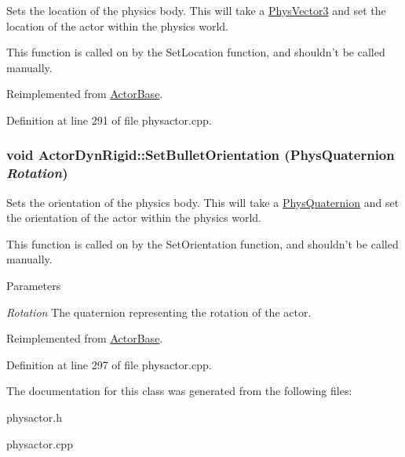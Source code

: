 Sets the location of the physics body. This will take a \hyperlink{classPhysVector3}{PhysVector3} and set the location of the actor within the physics world. \par
 This function is called on by the SetLocation function, and shouldn't be called manually. 

Reimplemented from \hyperlink{classActorBase_af64a57138bbd32c52581a5c8d0d29a76}{ActorBase}.

Definition at line 291 of file physactor.cpp.\hypertarget{classActorDynRigid_ae471894081ae956dd79844a2f14fb1d9}{
\subsubsection[{SetBulletOrientation}]{\setlength{\rightskip}{0pt plus 5cm}void ActorDynRigid::SetBulletOrientation ({\bf PhysQuaternion} {\em Rotation})}}
\label{d4/d0e/classActorDynRigid_ae471894081ae956dd79844a2f14fb1d9}


Sets the orientation of the physics body. This will take a \hyperlink{classPhysQuaternion}{PhysQuaternion} and set the orientation of the actor within the physics world. \par
 This function is called on by the SetOrientation function, and shouldn't be called manually. 
\begin{DoxyParams}{Parameters}
\item[{\em Rotation}]The quaternion representing the rotation of the actor. \end{DoxyParams}


Reimplemented from \hyperlink{classActorBase_adf817bd5a7c562f31f6724a06a3a0f79}{ActorBase}.

Definition at line 297 of file physactor.cpp.

The documentation for this class was generated from the following files:\begin{DoxyCompactItemize}
\item 
physactor.h\item 
physactor.cpp\end{DoxyCompactItemize}
